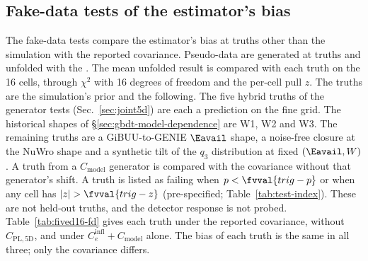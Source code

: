 \subsection{Fake-data tests of the estimator's bias}
\label{sec:fived16-fd}
The fake-data tests compare the estimator's bias at truths other than the simulation with the reported covariance. Pseudo-data are generated at  truths and unfolded with the \estMultiD{}. The mean unfolded result is compared with each truth on the 16 cells, through $\chi^2$ with 16 degrees of freedom and the per-cell pull $z$. The truths are the simulation's prior and the following. The five hybrid truths of the generator tests (Sec.~\ref{sec:joint5d}) are each a prediction on the fine grid. The historical shapes of \S\ref{sec:gbdt-model-dependence} are W1, W2 and W3. The remaining truths are a GiBUU-to-GENIE $\Eavail$ shape, a noise-free closure at the NuWro shape and a synthetic tilt of the $q_3$ distribution at fixed $(\Eavail,W)$. A truth from a $C_{\mathrm{model}}$ generator is compared with the covariance without that generator's shift. A truth is listed as failing when $p<\fvval{trig-p}$ or when any cell has $|z|>\fvval{trig-z}$ (pre-specified; Table~\ref{tab:test-index}). These are not held-out truths, and the detector response is not probed. Table~\ref{tab:fived16-fd} gives each truth under the reported covariance, without $C_{\mathrm{PL,5D}}$, and under $C_e^{\mathrm{infl}}+C_{\mathrm{model}}$ alone. The bias of each truth is the same in all three; only the covariance differs.

